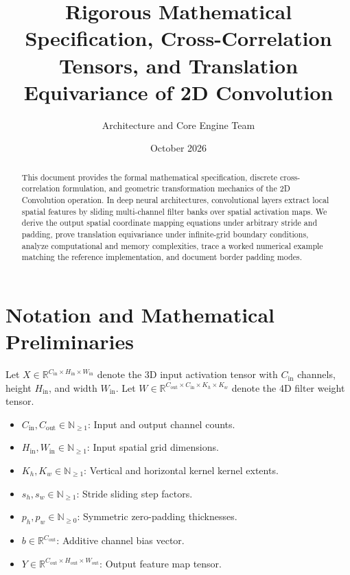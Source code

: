 \documentclass[11pt,a4paper]{article}
\title{\textbf{Rigorous Mathematical Specification, Cross-Correlation Tensors, and Translation Equivariance of 2D Convolution}}
\author{Architecture and Core Engine Team}
\date{October 2026}
\theoremstyle{definition}
\begin{document}
\maketitle

\begin{abstract}
This document provides the formal mathematical specification, discrete cross-correlation formulation, and geometric transformation mechanics of the 2D Convolution operation. In deep neural architectures, convolutional layers extract local spatial features by sliding multi-channel filter banks over spatial activation maps. We derive the output spatial coordinate mapping equations under arbitrary stride and padding, prove translation equivariance under infinite-grid boundary conditions, analyze computational and memory complexities, trace a worked numerical example matching the reference implementation, and document border padding modes.
\end{abstract}

\section{Notation and Mathematical Preliminaries}

Let $X \in \mathbb{R}^{C_{\text{in}} \times H_{\text{in}} \times W_{\text{in}}}$ denote the 3D input activation tensor with $C_{\text{in}}$ channels, height $H_{\text{in}}$, and width $W_{\text{in}}$. Let $W \in \mathbb{R}^{C_{\text{out}} \times C_{\text{in}} \times K_h \times K_w}$ denote the 4D filter weight tensor.

\begin{itemize}
    \item $C_{\text{in}}, C_{\text{out}} \in \mathbb{N}_{\ge 1}$: Input and output channel counts.
    \item $H_{\text{in}}, W_{\text{in}} \in \mathbb{N}_{\ge 1}$: Input spatial grid dimensions.
    \item $K_h, K_w \in \mathbb{N}_{\ge 1}$: Vertical and horizontal kernel kernel extents.
    \item $s_h, s_w \in \mathbb{N}_{\ge 1}$: Stride sliding step factors.
    \item $p_h, p_w \in \mathbb{N}_{\ge 0}$: Symmetric zero-padding thicknesses.
    \item $b \in \mathbb{R}^{C_{\text{out}}}$: Additive channel bias vector.
    \item $Y \in \mathbb{R}^{C_{\text{out}} \times H_{\text{out}} \times W_{\text{out}}}$: Output feature map tensor.
\end{itemize}
\end{document}
